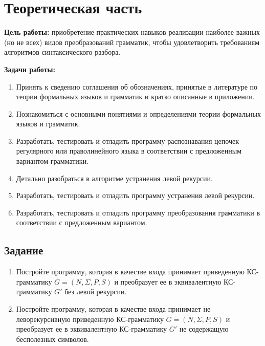 \section{Теоретическая часть}

\textbf{Цель работы:} приобретение практических навыков реализации наиболее важных (но не всех) видов преобразований грамматик, чтобы удовлетворить требованиям алгоритмов синтаксического разбора.

\textbf{Задачи работы:}

\begin{enumerate}
	\item Принять к сведению соглашения об обозначениях, принятые в литературе по теории формальных языков и грамматик и кратко описанные в приложении.	
	\item Познакомиться с основными понятиями и определениями теории формальных языков и грамматик.
	\item Разработать, тестировать и отладить программу распознавания цепочек регулярного или праволинейного языка в соответствии с предложенным вариантом грамматики.
	\item Детально разобраться в алгоритме устранения левой рекурсии.
	\item Разработать, тестировать и отладить программу устранения левой рекурсии.
	\item Разработать, тестировать и отладить программу преобразования грамматики в соответствии с предложенным вариантом.
\end{enumerate}

\subsection{Задание}

\begin{enumerate}
	\item Постройте программу, которая в качестве входа принимает приведенную КС-грамматику $G = (N, \Sigma, P, S)$ и преобразует ее в эквивалентную КС-грамматику $G'$ без левой рекурсии.
	\item Постройте программу, которая в качестве входа принимает не леворекурсивную приведенную КС-грамматику $G = (N, \Sigma, P, S)$ и преобразует ее в эквивалентную КС-грамматику $G'$ не содержащую бесполезных символов.
\end{enumerate}

\newpage